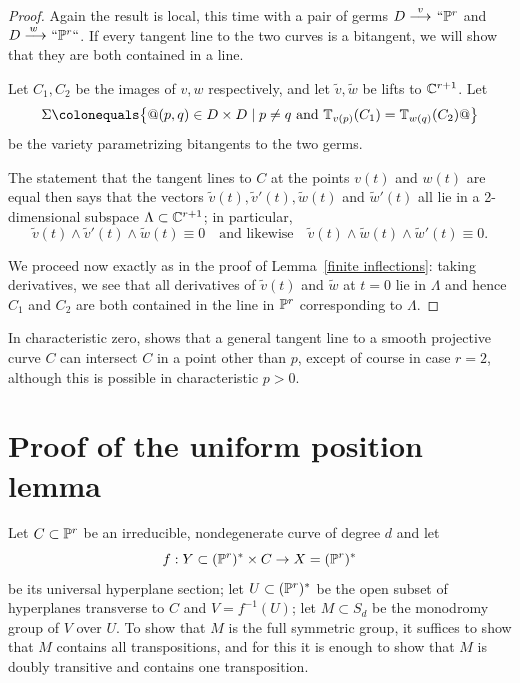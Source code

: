 \begin{proof} Again the result is local, this time with a pair of germs
 $D\ruto {\ v} ` `\PP^r$ and $D\ruto {\,w} ` `\PP^r` `$. If every
 tangent line to the two curves is a bitangent, we will show that they
 are both contained in a line.

  Let $C_1, C_2$ be the images of $v,w$ respectively, and let $\tilde v,
  \tilde w$ be lifts to ${\mathbb C}^{r+1}$.
 Let
 $$
 \Sigma \colonequals  \bigl\{@ (p,q) \in D \times D \mid p\neq q \text{ and
 }\TT_{v(p)}(C_1) = \TT_{w(q)}(C_2)@ \bigr\}
 $$
 be the variety parametrizing bitangents to the two germs.



 The statement that the tangent lines to $C$ at the points $v(t)$
 and $w(t)$ are equal then says that the vectors $\tilde v(t), \tilde
 v'(t),\tilde w(t)$ and $\tilde w'(t)$ all lie in a 2-dimen\-sional subspace
 $\Lambda \subset {\mathbb C}^{r+1}$; in particular,
 $$
 \tilde v(t) \wedge \tilde v'(t) \wedge \tilde w(t) \equiv 0 \quad
 \text{and likewise} \quad \tilde v(t) \wedge \tilde w(t) \wedge \tilde
 w'(t) \equiv 0
.
 $$

We proceed now exactly as in the proof of Lemma~\ref{finite inflections}:
taking derivatives, we see that all derivatives of $\tilde v(t)$
and $\tilde w$ at $t=0$ lie in $\Lambda$
and hence $C_1$ and $C_2$ are both contained in the line in ${\mathbb P}^r$
corresponding to $\Lambda$.
 \end{proof}

In characteristic zero, \cite[Theorem 3.1]{kaji-tangentialDegeneracy}
shows that a general tangent line to a smooth projective curve $C$ can
intersect $C$ in a point other than $p$, except of course in case $r=2$,
although this is possible in characteristic $p>0$.

\section{Proof of the uniform position 
lemma
}

Let $C \subset {\mathbb P}^r$ be an irreducible, nondegenerate curve of degree $d$
and 
let
$$f : Y \subset ({\mathbb P}^r)^* \times C \to  X = ({\mathbb P}^r)^*$$ 
be
its universal
hyperplane section; let $U \subset ({\mathbb P}^r)^*$ be the open subset of
hyperplanes transverse to $C$ and $V = f^{-1}(U)$; let $M \subset S_d$
be the monodromy group of $V$ over $U$.
To show that  $M$ is the full symmetric group, it suffices to show that
$M$ contains all transpositions, and for this it is enough to show that
%
$M$ is doubly transitive and contains one transposition.

